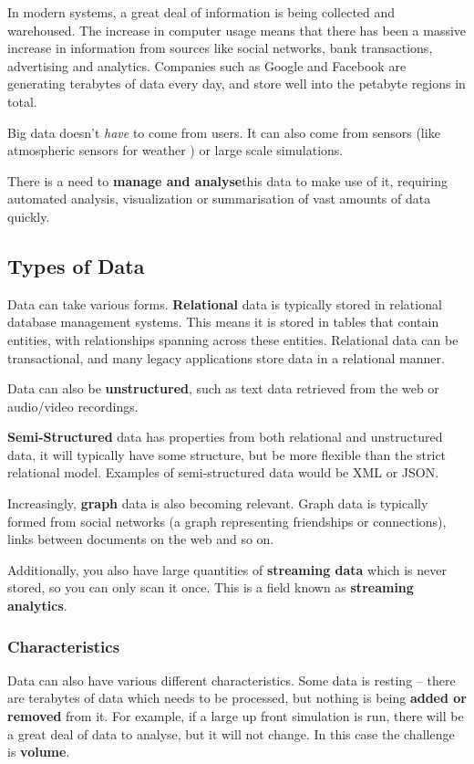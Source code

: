 \documentclass{article}
\begin{document}
In modern systems, a great deal of information is being collected and warehoused. The increase in computer usage means that there has been a massive increase in information from sources like social networks, bank transactions, advertising and analytics. Companies such as Google and Facebook are generating terabytes of data every day, and store well into the petabyte regions in total.

Big data doesn't \textit{have} to come from users. It can also come from sensors (like atmospheric sensors for weather ) or large scale simulations.

There is a need to \textbf{manage and analyse}this data to make use of it, requiring automated analysis, visualization or summarisation of vast amounts of data quickly. 

\subsection{Types of Data}

Data can take various forms. \textbf{Relational} data is typically stored in relational database management systems. This means it is stored in tables that contain entities, with relationships spanning across these entities. Relational data can be transactional, and many legacy applications store data in a relational manner. 

Data can also be \textbf{unstructured}, such as text data retrieved from the web or audio/video recordings.

\textbf{Semi-Structured} data has properties from both relational and unstructured data, it will typically have some structure, but be more flexible than the strict relational model. Examples of semi-structured data would be XML or JSON. 

Increasingly, \textbf{graph} data is also becoming relevant. Graph data is typically formed from social networks (a graph representing friendships or connections), links between documents on the web and so on.

Additionally, you also have large quantities of \textbf{streaming data} which is never stored, so you can only scan it once. This is a field known as \textbf{streaming analytics}. 

\subsubsection{Characteristics}

Data can also have various different characteristics. Some data is resting -- there are terabytes of data which needs to be processed, but nothing is being \textbf{added or removed} from it. For example, if a large up front simulation is run, there will be a great deal of data to analyse, but it will not change. In this case the challenge is \textbf{volume}.
\end{document}
